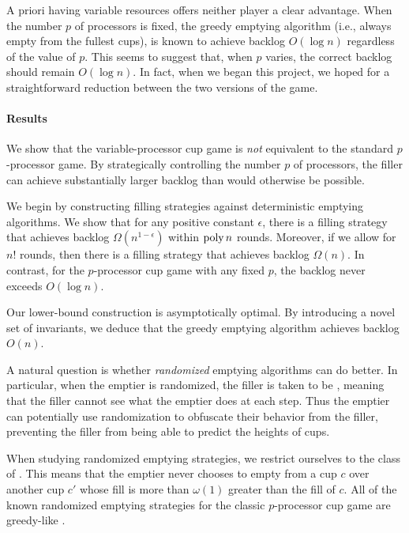 A priori having variable resources offers neither player a clear
advantage. When the number $p$ of processors is fixed, the greedy
emptying algorithm (i.e., always empty from the fullest cups), is
known to achieve backlog $O(\log n)$ \cite{AdlerBeFr03,
BenderFaKu19, Kuszmaul20} regardless of the value of $p$. This
seems to suggest that, when $p$ varies, the correct backlog
should remain $O(\log n)$. In fact, when we began this project,
we hoped for a straightforward reduction between the two versions
of the game.

\paragraph{Results}
We show that the variable-processor cup game is \emph{not}
equivalent to the standard $p$-processor game. By strategically
controlling the number $p$ of processors, the filler can achieve
substantially larger backlog than would otherwise be possible.

We begin by constructing filling strategies against deterministic
emptying algorithms. We show that for any positive constant
$\epsilon$, there is a filling strategy that achieves backlog
$\Omega(n^{1 - \epsilon})$ within $\operatorname{\text{poly}} n$ rounds. Moreover, if
we allow for $n!$ rounds, then there is a filling strategy that
achieves backlog $\Omega(n)$. In contrast, for the $p$-processor
cup game with any fixed $p$, the backlog never exceeds $O(\log
n)$.

Our lower-bound construction is asymptotically optimal. By
introducing a novel set of invariants, we deduce that the greedy
emptying algorithm achieves backlog $O(n)$.

A natural question is whether \emph{randomized} emptying
algorithms can do better. In particular, when the emptier is
randomized, the filler is taken to be , meaning
that the filler cannot see what the emptier does at each step.
Thus the emptier can potentially use randomization to obfuscate
their behavior from the filler, preventing the filler from being
able to predict the heights of cups.

When studying randomized emptying strategies, we restrict
ourselves to the class of .
This means that the emptier never chooses to empty from a cup $c$
over another cup $c'$ whose fill is more than $\omega(1)$ greater
than the fill of $c$. All of the known randomized emptying
strategies for the classic $p$-processor cup game are greedy-like
\cite{BenderFaKu19, Kuszmaul20}.

